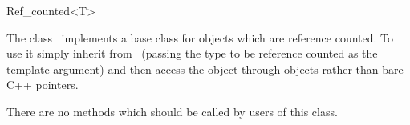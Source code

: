 

\begin{ccRefClass}{Ref_counted<T>}  %


\ccDefinition
  
The class \ccRefName\ implements a base class for objects which are reference counted. To use it simply inherit from \ccRefName\ (passing the type to be reference counted as the template argument) and then access the object through  objects rather than bare C++ pointers.



\ccTypes


\ccCreation
{}  %


\ccOperations

There are no methods which should be called by users of this class.


\ccExample




\end{ccRefClass}


